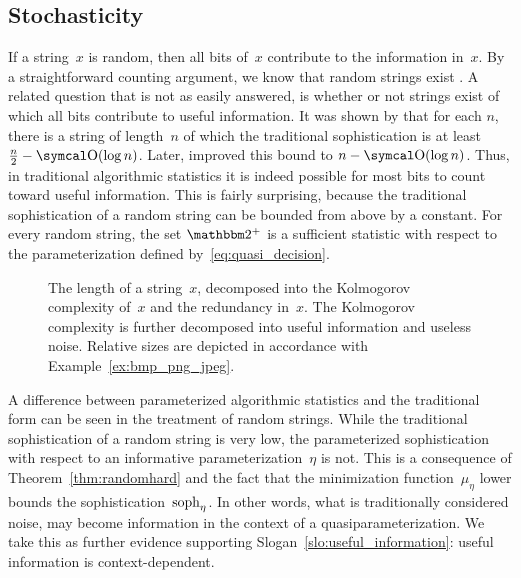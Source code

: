 \subsection{Stochasticity}
\label{sec:stochasticity}%
If a string~$x$ is random, then all bits of~$x$ contribute to the information in~$x$.
By a straightforward counting argument, we know that random strings exist \parencite{li2008introduction}.
A related question that is not as easily answered, is whether or not strings exist of which all bits contribute to useful information.
It was shown by \textcite{shen1983concept} that for each $n$, there is a string of length~$n$ of which the traditional sophistication is at least $\frac{n}{2} - \bigO(\log n)$.
Later, \textcite{gacs2001algorithmic} improved this bound to $n - \bigO(\log n)$.
Thus, in traditional algorithmic statistics it is indeed possible for most bits to count toward useful information.
This is fairly surprising, because the traditional sophistication of a random string can be bounded from above by a constant.
For every random string, the set $\binary^+$ is a sufficient statistic with respect to the parameterization defined by~\eqref{eq:quasi_decision}.

\begin{figure}
  \centering
  \caption{
    The length of a string~$x$, decomposed into the Kolmogorov complexity of~$x$ and the redundancy in~$x$.
    The Kolmogorov complexity is further decomposed into useful information and useless noise.
    Relative sizes are depicted in accordance with Example~\ref{ex:bmp_png_jpeg}.
  }
  \label{fig:length_decomposed}
\end{figure}

A difference between parameterized algorithmic statistics and the traditional form can be seen in the treatment of random strings.
While the traditional sophistication of a random string is very low, the parameterized sophistication with respect to an informative parameterization~$\eta$ is not.
This is a consequence of Theorem~\ref{thm:randomhard} and the fact that the minimization function~$\mu_\eta$ lower bounds the sophistication~$\operatorname{soph}_\eta$.
In other words, what is traditionally considered noise, may become information in the context of a quasiparameterization.
We take this as further evidence supporting Slogan~\ref{slo:useful_information}: useful information is context-dependent.

